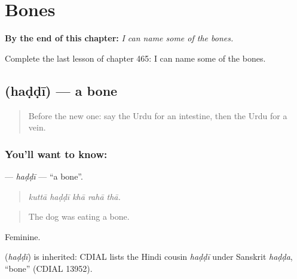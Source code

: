 
\chapter{Bones}
\label{ch:ur-bones}

\begin{chapteropening}
\textbf{By the end of this chapter:} \emph{I can name some of the bones.}

Complete the last lesson of chapter 465: I can name some of the bones.
\end{chapteropening}

\section[\texorpdfstring{\ur{ہڈی} (haḍḍī)}{ہڈی (haḍḍī)}]{ (haḍḍī) — a bone}

\label{lesson:UR-C465-haddi}



\begin{quote}
Before the new one: say the Urdu for an intestine, then the Urdu for a vein.
\end{quote}

\subsection*{You'll want to know: }
\textbf{} — \emph{haḍḍī} — \textquotedblleft{}a bone\textquotedblright{}.

\begin{quote}
    
\end{quote}

\begin{quote}
\emph{kuttā haḍḍī khā rahā thā.}
\end{quote}

\begin{quote}
The dog was eating a bone.
\end{quote}

Feminine.

\begin{cousinweb}
\textbf{} (\emph{haḍḍī}) is inherited: CDIAL lists the Hindi cousin \emph{haḍḍī} under Sanskrit \emph{haḍḍa}, \textquotedblleft{}bone\textquotedblright{} (CDIAL 13952).
\end{cousinweb}

